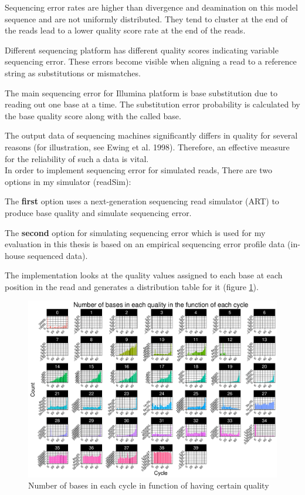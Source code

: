 \documentclass[11pt,a4paper]{report}
\begin{document}
Sequencing error rates are higher than divergence and deamination
on this model sequence and are not uniformly distributed. They tend to 
cluster at the end of the reads lead to a lower quality score rate at 
the end of the reads.

Different sequencing platform has different quality scores indicating 
variable sequencing error. These errors become visible when aligning a 
read to a reference string as substitutions or mismatches.



The main sequencing error for Illumina platform is base substitution due to 
reading out one base at a time\cite{art}. The substitution error probability 
is calculated by the base quality score along with the called base.

The output data of sequencing machines significantly differs in quality for 
several reasons (for illustration, see Ewing et al. 1998).  Therefore, an 
effective measure for the reliability of such a data is vital\cite{phred1}.\\



In order to implement sequencing error for simulated reads, There are two
options in my simulator (readSim):

The \textbf{first} option uses a next-generation sequencing read simulator 
(ART) to produce base quality and simulate sequencing error.


The \textbf{second} option for simulating sequencing error which is used for
my evaluation in this thesis is based on an empirical sequencing error profile 
data (in-house sequenced data).

The implementation looks at the quality values assigned to each base at each
position in the read and generates a distribution table for it (figure \ref{hist}).

\begin{figure}[H]
\centering
\includegraphics[width=12cm]{pictures/Rplot_quality.pdf}
\caption{Number of bases in each cycle in function of having certain quality}
\label{hist}
\end{figure}
\end{document}

